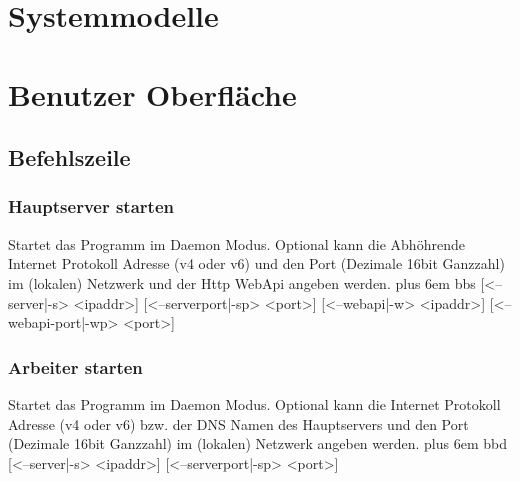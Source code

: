 \documentclass[a4paper,12pt]{article}
\makeatletter
\newenvironment{mycode}
 {\def\@xobeysp{\ }\verbatim\rightskip=0pt plus 6em\relax}
 {\endverbatim}
\makeatother
\begin{document}










\section{Systemmodelle}


\clearpage
\section{Benutzer Oberfläche}
\subsection{Befehlszeile}

\subsubsection{Hauptserver starten}
Startet das Programm im \gls{Daemon} Modus. Optional kann die Abhöhrende Internet Protokoll Adresse (v4 oder v6) und den Port (Dezimale 16bit Ganzzahl) im (lokalen) Netzwerk und der Http WebApi angeben werden.
\begin{mycode}
bbs [<--server|-s> <ipaddr>] [<--serverport|-sp> <port>] [<--webapi|-w> <ipaddr>] [<--webapi-port|-wp> <port>]
\end{mycode}

\subsubsection{Arbeiter starten}
Startet das Programm im \gls{Daemon} Modus. Optional kann die Internet Protokoll Adresse (v4 oder v6) bzw. der DNS Namen des Hauptservers und den Port (Dezimale 16bit Ganzzahl) im (lokalen) Netzwerk angeben werden.
\begin{mycode}
bbd [<--server|-s> <ipaddr>] [<--serverport|-sp> <port>]
\end{mycode}
\end{document}
